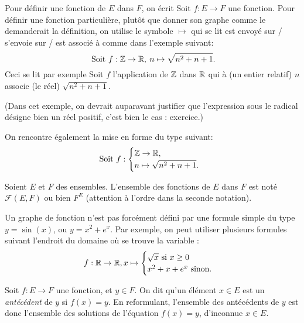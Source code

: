 Pour définir une fonction de $E$ dans $F$, on écrit \og Soit $f : E\to F$ une fonction\fg. Pour définir une fonction particulière, plutôt que donner son graphe comme le demanderait la définition, on utilise le symbole \og$\mapsto$\fg{} qui se lit \og est envoyé sur / s'envoie sur / est associé à \fg{} comme dans l'exemple suivant:
\[
\text{ Soit } f :\mathbb{Z} \to \mathbb{R},\: n\mapsto \sqrt{n^2+n+1}.
\]
Ceci se lit par exemple \og Soit $f$ l'application de $\mathbb{Z}$ dans $\mathbb{R}$ qui à (un entier relatif) $n$ associe (le réel) $\sqrt{n^2+n+1}$\fg.


(Dans cet exemple, on devrait auparavant justifier que l'expression sous le radical désigne bien un réel positif, c'est bien le cas : exercice.)

On rencontre également la mise en forme du type suivant:
\[
\text{ Soit } f :\begin{cases}\mathbb{Z} \to \mathbb{R},\\ n\mapsto \sqrt{n^2+n+1}.\end{cases}
\]
\begin{definition}
Soient $E$ et $F$ des ensembles. L'ensemble des fonctions de $E$ dans $F$ est noté $\mathcal F(E,F)$ ou bien $F^E$ (attention à l'ordre dans la seconde notation).
\end{definition}

\begin{remarque} Un graphe de fonction n'est pas forcément défini par une formule simple du type $y=\sin(x)$, ou $y=x^2+e^x$. Par exemple, on peut utiliser plusieurs formules suivant l'endroit du domaine où se trouve la variable :
\[ f: 
\mathbb{R} \to \mathbb{R}, 
x\mapsto \begin{cases}\sqrt{x}\text{ si }x\geq 0\\ x^2+x+e^x\text{ sinon.}\end{cases}\]
\end{remarque}

\begin{definition}
Soit $f : E\to F$ une fonction, et $y\in F$. On dit qu'un élément $x\in E$ est un \emph{antécédent} de $y$ si $f(x)=y$. En reformulant, l'ensemble des antécédents de $y$ est donc l'ensemble des solutions de l'équation $f(x)=y$, d'inconnue $x\in E$.
\end{definition}

